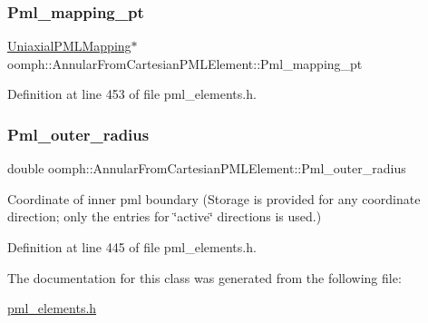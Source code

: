 \subsubsection{\texorpdfstring{Pml\+\_\+mapping\+\_\+pt}{Pml\_mapping\_pt}}
{\footnotesize\ttfamily \hyperlink{classoomph_1_1UniaxialPMLMapping}{Uniaxial\+P\+M\+L\+Mapping}$\ast$ oomph\+::\+Annular\+From\+Cartesian\+P\+M\+L\+Element\+::\+Pml\+\_\+mapping\+\_\+pt\hspace{0.3cm}{\ttfamily [protected]}}



Definition at line 453 of file pml\+\_\+elements.\+h.

\mbox{\label{classoomph_1_1AnnularFromCartesianPMLElement_a2dd7b0074775618fcb2e1072fd81d10a}} 
\subsubsection{\texorpdfstring{Pml\+\_\+outer\+\_\+radius}{Pml\_outer\_radius}}
{\footnotesize\ttfamily double oomph\+::\+Annular\+From\+Cartesian\+P\+M\+L\+Element\+::\+Pml\+\_\+outer\+\_\+radius\hspace{0.3cm}{\ttfamily [protected]}}



Coordinate of inner pml boundary (Storage is provided for any coordinate direction; only the entries for \char`\"{}active\char`\"{} directions is used.) 



Definition at line 445 of file pml\+\_\+elements.\+h.



The documentation for this class was generated from the following file\+:\begin{DoxyCompactItemize}
\item 
\hyperlink{pml__elements_8h}{pml\+\_\+elements.\+h}\end{DoxyCompactItemize}
